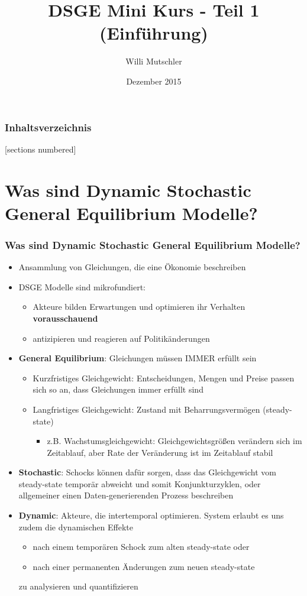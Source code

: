 \documentclass[10pt]{beamer}  %
\title{DSGE Mini Kurs - Teil 1 (Einf\"{u}hrung)}
\author{Willi Mutschler}
\date{Dezember 2015}
\begin{document}
\begin{frame}
\titlepage
\end{frame}

\begin{frame}\frametitle{Inhaltsverzeichnis}
[sections numbered]
    \tableofcontents
\end{frame}

\section{Was sind Dynamic Stochastic General Equilibrium Modelle?}\small
\begin{frame}
\frametitle{Was sind Dynamic Stochastic General Equilibrium Modelle?}
\begin{itemize}
\item Ansammlung von Gleichungen, die eine \"{O}konomie beschreiben
\item DSGE Modelle sind mikrofundiert:
\begin{itemize}\footnotesize
\item Akteure bilden Erwartungen und optimieren ihr Verhalten \textbf{vorausschauend}
\item antizipieren und reagieren auf Politik\"{a}nderungen
\end{itemize}
\item \textbf{General Equilibrium}: Gleichungen m\"{u}ssen IMMER erf\"{u}llt sein
\begin{itemize}\footnotesize
\item Kurzfristiges Gleichgewicht: Entscheidungen, Mengen und Preise passen sich so an, dass Gleichungen immer erf\"{u}llt sind
\item Langfristiges Gleichgewicht: Zustand mit Beharrungsverm\"{o}gen (steady-state)
    \begin{itemize}\scriptsize
    \item z.B. Wachstumsgleichgewicht: Gleichgewichtsgr\"{o}{\ss}en ver\"{a}ndern sich im Zeitablauf, aber Rate der Ver\"{a}nderung ist im Zeitablauf stabil
    \end{itemize}
\end{itemize}
\item \textbf{Stochastic}: Schocks k\"{o}nnen daf\"{u}r sorgen, dass das Gleichgewicht vom steady-state tempor\"{a}r abweicht und somit Konjunkturzyklen, oder allgemeiner einen Daten-generierenden Prozess beschreiben
\item \textbf{Dynamic}: Akteure, die intertemporal optimieren. System erlaubt es uns zudem die dynamischen Effekte
    \begin{itemize}\footnotesize
    \item nach einem tempor\"{a}ren Schock zum alten steady-state oder
    \item nach einer permanenten \"{A}nderungen zum neuen steady-state
    \end{itemize}
    zu analysieren und quantifizieren
\end{itemize}
\end{frame}
\end{document}

